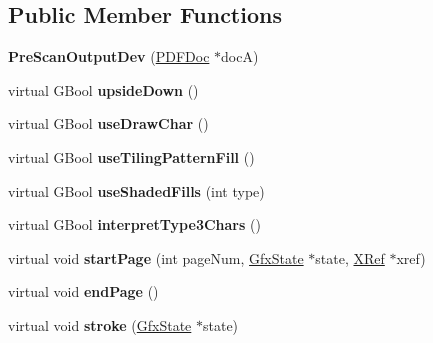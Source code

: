 \subsection*{Public Member Functions}
\begin{DoxyCompactItemize}
\item 
\mbox{\label{class_pre_scan_output_dev_a3f6bc27f2873be899e251077dba5350c}} 
{\bfseries Pre\+Scan\+Output\+Dev} (\hyperlink{class_p_d_f_doc}{P\+D\+F\+Doc} $\ast$docA)
\item 
\mbox{\label{class_pre_scan_output_dev_af1146cb564d659b0044d44890bfa1bcb}} 
virtual G\+Bool {\bfseries upside\+Down} ()
\item 
\mbox{\label{class_pre_scan_output_dev_af48d04058ec1855c428a6d17fd0d1d40}} 
virtual G\+Bool {\bfseries use\+Draw\+Char} ()
\item 
\mbox{\label{class_pre_scan_output_dev_a94975f349137479251039faa0bf60bb7}} 
virtual G\+Bool {\bfseries use\+Tiling\+Pattern\+Fill} ()
\item 
\mbox{\label{class_pre_scan_output_dev_ab9d892e4a362a3fc17bd86eebec0ca5f}} 
virtual G\+Bool {\bfseries use\+Shaded\+Fills} (int type)
\item 
\mbox{\label{class_pre_scan_output_dev_ab18c07e153ca45ebcd17a1b60f055410}} 
virtual G\+Bool {\bfseries interpret\+Type3\+Chars} ()
\item 
\mbox{\label{class_pre_scan_output_dev_a9a9b8cb67543163e7e4a1563b881d5b3}} 
virtual void {\bfseries start\+Page} (int page\+Num, \hyperlink{class_gfx_state}{Gfx\+State} $\ast$state, \hyperlink{class_x_ref}{X\+Ref} $\ast$xref)
\item 
\mbox{\label{class_pre_scan_output_dev_a71bfdce77e0cfc6511a9ee3338ce7199}} 
virtual void {\bfseries end\+Page} ()
\item 
\mbox{\label{class_pre_scan_output_dev_a87f9ac11a91ae70e125e974bc6d38634}} 
virtual void {\bfseries stroke} (\hyperlink{class_gfx_state}{Gfx\+State} $\ast$state)

\end{DoxyCompactItemize}
